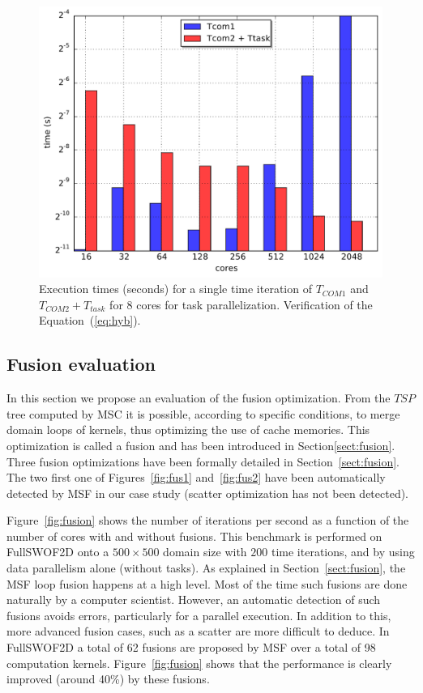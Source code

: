 \begin{figure}[!h]\begin{center}
  \includegraphics[width=.6\textwidth]{../results/task_scaling/500_200/analytic/tth.pdf}
  \caption{Execution times (seconds) for a single time iteration of $T_{COM1}$ and $T_{COM2} + T_{task}$ for 8 cores for task parallelization. Verification of the Equation~(\ref{eq:hyb}).}
  \label{fig:tth2}
\end{center}\end{figure}

\subsection{Fusion evaluation}
\label{sect:fus}

In this section we propose an evaluation of the fusion optimization. From the $TSP$ tree computed by MSC it is possible, according to specific conditions, to merge domain loops of kernels, thus optimizing the use of cache memories. This optimization is called a fusion and has been introduced in Section\ref{sect:fusion}. Three fusion optimizations
%
have been formally detailed in Section~\ref{sect:fusion}. The two first one of Figures~\ref{fig:fus1} and~\ref{fig:fus2} have been automatically detected by MSF in our case study (\ie scatter optimization has not been detected).

Figure~\ref{fig:fusion} shows the number of iterations per second as a function of the number of cores with and without fusions. This benchmark is performed on FullSWOF2D onto a $500 \times 500$ domain size with $200$ time iterations, and by using data parallelism alone (without tasks). As explained in Section~\ref{sect:fusion}, the MSF loop fusion happens at a high level. Most of the time such fusions are done naturally by a computer scientist. However, an automatic detection of such fusions avoids errors, particularly for a parallel execution. In addition to this, more advanced fusion cases, such as a scatter are more difficult to deduce. In FullSWOF2D a total of  62 fusions are proposed by MSF over a total of 98 computation kernels. Figure~\ref{fig:fusion} shows that the performance is clearly improved (around 40\%) by these fusions.

